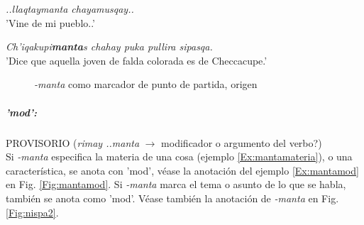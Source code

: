 \documentclass[a4paper,11pt,DIV12]{scrartcl}
\begin{document}
\begin{examples}
 \item\label{Ex:mantasrc}  {\em ..llaqtaymanta chayamusqay..}\\
	'Vine de mi pueblo..'\\
      	 \hfill{\small \citep{Valderrama77}}
 \item {\em Ch'iqakupi\textbf{manta}s chahay puka pullira sipasqa.}\\
	'Dice que aquella joven de falda colorada es de Checcacupe.'\\
      	 \hfill{\small \citep[125]{Cusi2}}
\end{examples}


\begin{figure}
 \begin{center}
\end{center}
\caption{{\em -manta} como marcador de punto de partida, origen}\label{Fig:mantasrc}
\end{figure}

\subparagraph{'mod':}
PROVISORIO ({\em rimay ..manta} $\rightarrow$ modificador o argumento del verbo?)\\
Si {\em -manta} especifica la materia de una cosa (ejemplo \ref{Ex:mantamateria}), o una caracter\'istica, se anota con 'mod', v\'ease la anotaci\'on del ejemplo \ref{Ex:mantamod} en Fig. \ref{Fig:mantamod}. Si {\em -manta} marca el tema o asunto de lo que se habla, tambi\'en se anota como 'mod'. V\'ease tambi\'en la anotaci\'on de {\em -manta} en Fig. \ref{Fig:nispa2}.
\end{document}
